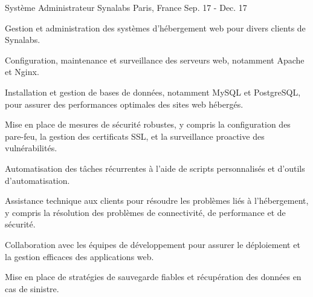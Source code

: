 \begin{cventries}
  \cventry
    {Système Administrateur} %
    {Synalabs} %
    {Paris, France} %
    {Sep. 17 - Dec. 17} %
    {
      \begin{cvitems} %
        \item {Gestion et administration des systèmes d'hébergement web pour divers clients de Synalabs.}
        \item {Configuration, maintenance et surveillance des serveurs web, notamment Apache et Nginx.}
        \item {Installation et gestion de bases de données, notamment MySQL et PostgreSQL, pour assurer des performances optimales des sites web hébergés.}
        \item {Mise en place de mesures de sécurité robustes, y compris la configuration des pare-feu, la gestion des certificats SSL, et la surveillance proactive des vulnérabilités.}
        \item {Automatisation des tâches récurrentes à l'aide de scripts personnalisés et d'outils d'automatisation.}
        \item {Assistance technique aux clients pour résoudre les problèmes liés à l'hébergement, y compris la résolution des problèmes de connectivité, de performance et de sécurité.}
        \item {Collaboration avec les équipes de développement pour assurer le déploiement et la gestion efficaces des applications web.}
        \item {Mise en place de stratégies de sauvegarde fiables et récupération des données en cas de sinistre.}
      \end{cvitems}
    }


\end{cventries}

